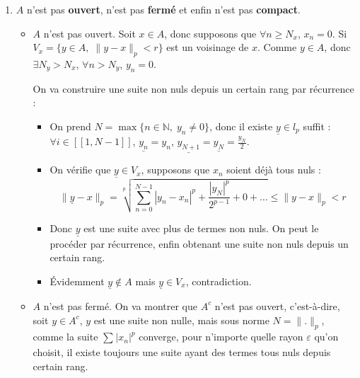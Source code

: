 \begin{solution}
\begin{enumerate}
\begin{itemize}
        \end{itemize}

      \item $A$ n'est pas \textbf{ouvert}, n'est pas \textbf{fermé} et enfin n'est pas \textbf{compact}.
      \begin{itemize}

        \item $A$ n'est pas ouvert. Soit $x \in A$, donc supposons que $\forall n \ge N_x$, $x_n=0$. Si $V_x = \{ y \in A,\; \| y - x \|_p < r \}$ est un voisinage de $x$. Comme $y \in A$, donc $\exists N_y > N_x$, $\forall n> N_y$, $y_n = 0$. 

          On va construire une suite non nuls depuis un certain rang par récurrence : 

          \begin{itemize}


            \item On prend $N = \max\{n \in \mathbb{N},\; y_n \ne 0 \}$, donc il existe $\underline{y} \in l_p$ suffit : $\forall i \in [\![1, N-1]\!]$, $\underline{y_n} = y_n$, $\underline{y _{N+1}} = \underline{y_N} = \frac{y_N}{2}$.

            \item On vérifie que $\underline{y} \in V_x$, supposons que $x_n$ soient déjà tous nuls : 
              \begin{equation}
                \| \underline{y} - x \|_p = \sqrt[p]{\sum_{n=0}^{N-1}| y_n - x_n| ^{p} + \frac{|y_N| ^{p}}{2 ^{p-1}} +0 + \dots} \le \| y -x \|_p < r
              \end{equation}
            \item Donc $\underline{y}$ est une suite avec plus de termes non nuls. On peut le procéder par récurrence, enfin obtenant une suite non nuls depuis un certain rang.
            \item Évidemment $\underline{y} \not \in A$ mais $\underline{y} \in V_x$, contradiction.
          \end{itemize}


          

          \item $A$ n'est pas fermé. On va montrer que $A ^{c}$ n'est pas ouvert, c'est-à-dire, soit $y \in A ^{c}$, $y$ est une suite non nulle, mais sous norme $N = \| . \|_p$, comme la suite $\sum_{}^{}|x_n| ^{p}$ converge, pour n'importe quelle rayon $\varepsilon$ qu'on choisit, il existe toujours une suite ayant des termes tous nuls depuis certain rang.


\end{itemize}
\end{enumerate}
\end{solution}
